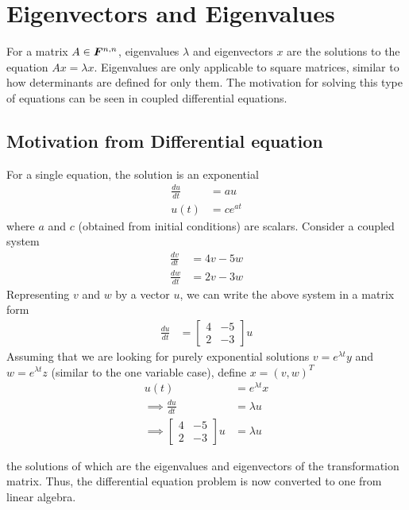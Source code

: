 \documentclass[../../linear_algebra.tex]{subfiles}
\begin{document}
\section{Eigenvectors and Eigenvalues}
For a matrix $A \in \bm{F}^{n, n}$, eigenvalues $\lambda$ and eigenvectors $x$ are the solutions to the equation $Ax = \lambda x$. Eigenvalues are only applicable to square matrices, similar to how determinants are defined for only them. The motivation for solving this type of equations can be seen in coupled differential equations.

\subsection{Motivation from Differential equation}
For a single equation, the solution is an exponential
\begin{align*}
    \frac{du}{dt} &= au\\
    u(t) &= ce^{at}
\end{align*}
where $a$ and $c$ (obtained from initial conditions) are scalars. Consider a coupled system
\begin{align*}
    \frac{dv}{dt} &= 4v - 5w\\
    \frac{dw}{dt} &= 2v - 3w
\end{align*}
Representing $v$ and $w$ by a vector $u$, we can write the above system in a matrix form
\begin{align*}
    \frac{du}{dt} &= \begin{bmatrix}
        4 &-5\\
        2 &-3
    \end{bmatrix}u
\end{align*}
Assuming that we are looking for purely exponential solutions $v = e^{\lambda t}y$ and $w = e^{\lambda t}z$ (similar to the one variable case), define $x = (v, w)^{T}$
\begin{align*}
    u(t) &= e^{\lambda t}x\\
    \implies \frac{du}{dt} &= \lambda u\\
    \implies \begin{bmatrix}
        4 &-5\\
        2 &-3
    \end{bmatrix}u &= \lambda u
\end{align*}

the solutions of which are the eigenvalues and eigenvectors of the transformation matrix. Thus, the differential equation problem is now converted to one from linear algebra.
\end{document}
